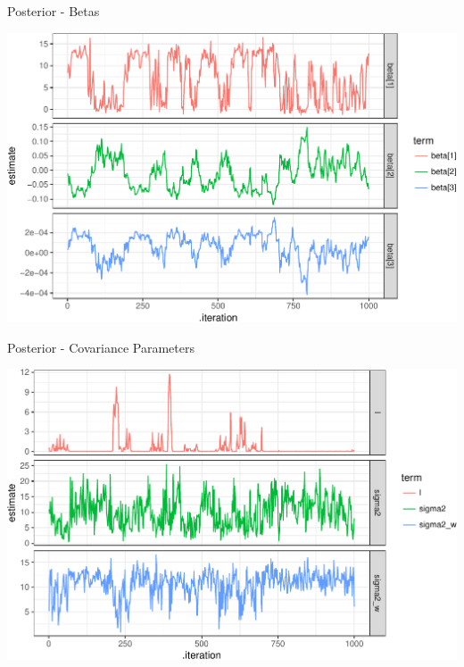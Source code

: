 \documentclass[11pt,ignorenonframetext,]{beamer}
\begin{document}
\begin{frame}{%
\protect\hypertarget{posterior---betas}{%
Posterior - Betas}}

\begin{center}\includegraphics[width=\textwidth]{Lec13_files/figure-beamer/unnamed-chunk-17-1} \end{center}

\end{frame}

\begin{frame}{%
\protect\hypertarget{posterior---covariance-parameters}{%
Posterior - Covariance Parameters}}

\begin{center}\includegraphics[width=\textwidth]{Lec13_files/figure-beamer/unnamed-chunk-18-1} \end{center}

\end{frame}
\end{document}
